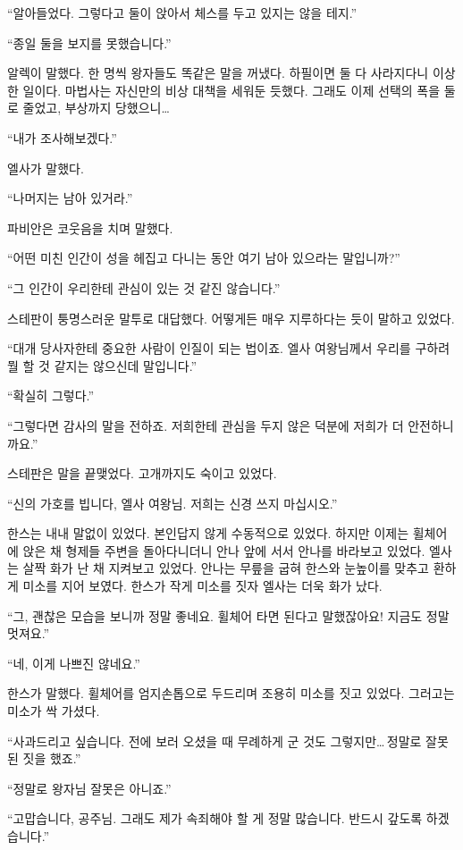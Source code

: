 ``알아들었다. 그렇다고 둘이 앉아서 체스를 두고 있지는 않을 테지.''

``종일 둘을 보지를 못했습니다.''

알렉이 말했다. 한 명씩 왕자들도 똑같은 말을 꺼냈다. 하필이면 둘 다 사라지다니 이상한 일이다. 마법사는 자신만의 비상 대책을 세워둔 듯했다. 그래도 이제 선택의 폭을 둘로 줄었고, 부상까지 당했으니\ldots

``내가 조사해보겠다.''

엘사가 말했다.

``나머지는 남아 있거라.''

파비안은 코웃음을 치며 말했다.

``어떤 미친 인간이 성을 헤집고 다니는 동안 여기 남아 있으라는 말입니까?''

``그 인간이 우리한테 관심이 있는 것 같진 않습니다.''

스테판이 퉁명스러운 말투로 대답했다. 어떻게든 매우 지루하다는 듯이 말하고 있었다.

``대개 당사자한테 중요한 사람이 인질이 되는 법이죠. 엘사 여왕님께서 우리를 구하려 뭘 할 것 같지는 않으신데 말입니다.''

``확실히 그렇다.''

``그렇다면 감사의 말을 전하죠. 저희한테 관심을 두지 않은 덕분에 저희가 더 안전하니까요.''

스테판은 말을 끝맺었다. 고개까지도 숙이고 있었다.

``신의 가호를 빕니다, 엘사 여왕님. 저희는 신경 쓰지 마십시오.''

한스는 내내 말없이 있었다. 본인답지 않게 수동적으로 있었다. 하지만 이제는 휠체어에 앉은 채 형제들 주변을 돌아다니더니 안나 앞에 서서 안나를 바라보고 있었다. 엘사는 살짝 화가 난 채 지켜보고 있었다. 안나는 무릎을 굽혀 한스와 눈높이를 맞추고 환하게 미소를 지어 보였다. 한스가 작게 미소를 짓자 엘사는 더욱 화가 났다.

``그, 괜찮은 모습을 보니까 정말 좋네요. 휠체어 타면 된다고 말했잖아요! 지금도 정말 멋져요.''

``네, 이게 나쁘진 않네요.''

한스가 말했다. 휠체어를 엄지손톱으로 두드리며 조용히 미소를 짓고 있었다. 그러고는 미소가 싹 가셨다.

``사과드리고 싶습니다. 전에 보러 오셨을 때 무례하게 군 것도 그렇지만\ldots\,정말로 잘못된 짓을 했죠.''

``정말로 왕자님 잘못은 아니죠.''

``고맙습니다, 공주님. 그래도 제가 속죄해야 할 게 정말 많습니다. 반드시 갚도록 하겠습니다.''

